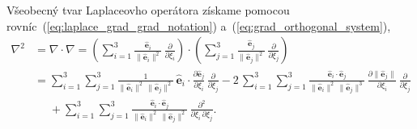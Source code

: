 \documentclass[a4paper, 12pt]{book}
\let\vec\mathbf
\begin{document}
Všeobecný tvar Laplaceovho operátora získame pomocou 
rovníc~(\ref{eq:laplace_grad_grad_notation}) 
a~(\ref{eq:grad_orthogonal_system}),
%
\begin{equation}
\label{eq:laplace_orthogonal_system_1}
\begin{split}
\nabla^2 &= \nabla \cdot \nabla = \left( \sum_{i = 1}^3 \frac{\hat{\vec 
e}_i}{\| \hat{\vec e}_i \|^2} \, \frac{\partial}{\partial \xi_i}\right) \cdot 
\left( \sum_{j = 1}^3 \frac{\hat{\vec e}_j}{\| \hat{\vec e}_j \|^2} \, 
\frac{\partial}{\partial \xi_j}
\right)\\
%
&= \sum_{i = 1}^{3} \sum_{j = 1}^3 \frac{1}{\| \hat{\vec e}_i \|^2 \, \| 
\hat{\vec e}_j \|^2} \, \hat{\vec e}_i \cdot \frac{\partial \hat{\vec 
e}_j}{\partial \xi_i} \, \frac{\partial}{\partial \xi_j}
- 2\, \sum_{i = 1}^{3} \sum_{j = 1}^3 \frac{\hat{\vec e}_i \cdot \hat{\vec 
e}_j}{\| \hat{\vec e}_i \|^2 \, \|\hat{\vec e}_j \|^3} \, \frac{\partial \| 
\hat{\vec e}_j \|}{\partial \xi_i} \, \frac{\partial}{\partial \xi_j}\\
%
&\phantom{={}}+ \sum_{i = 1}^{3} \sum_{j = 1}^3 \frac{\hat{\vec e}_i \cdot 
\hat{\vec e}_j}{\| \hat{\vec e}_i \|^2 \, \| \hat{\vec e}_j \|^2} \, 
\frac{\partial^2}{\partial \xi_i \, \partial \xi_j}{.}
\end{split}
%
\end{equation}
\end{document}
